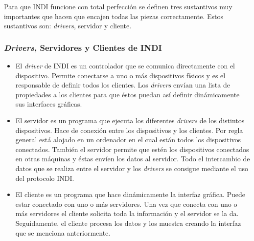 Para que INDI funcione con total perfección se definen tres sustantivos muy importantes que hacen que encajen todas las piezas correctamente. Estos sustantivos son: \textit{drivers}, servidor y cliente.

\subsubsection{\textit{Drivers}, Servidores y Clientes de INDI}
\begin{itemize}
  \item El \textit{driver} de INDI es un controlador que se comunica directamente con el dispositivo. Permite conectarse a uno o más dispositivos físicos y es el responsable de definir todos los clientes. Los \textit{drivers} envían una lista de propiedades a los clientes para que éstos puedan así definir dinámicamente sus interfaces gráficas.
  \item El servidor es un programa que ejecuta los diferentes \textit{drivers} de los distintos dispositivos. Hace de conexión entre los dispositivos y los clientes. Por regla general está alojado en un ordenador en el cual están todos los dispositivos conectados. También el servidor permite que estén los dispositivos conectados en otras máquinas y éstas envíen los datos al servidor.
 Todo el intercambio de datos que se realiza entre el servidor y los \textit{drivers} se consigue mediante el uso del protocolo INDI.
  \item El cliente es un programa que hace dinámicamente la interfaz gráfica. Puede estar conectado con uno o más servidores. Una vez que conecta con uno o más servidores el cliente solicita toda la información y el servidor se la da. Seguidamente, el cliente procesa los datos y los muestra creando la interfaz que se menciona anteriormente.
\end{itemize}

